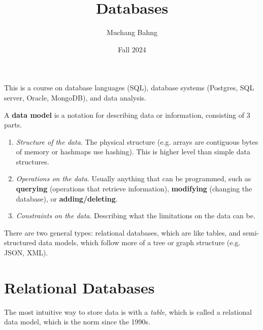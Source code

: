 \documentclass{article}
\begin{document}
\title{Databases}
\author{Muchang Bahng}
\date{Fall 2024}

\maketitle
\tableofcontents
\pagebreak

  This is a course on database languages (SQL), database systems (Postgres, SQL server, Oracle, MongoDB), and data analysis. 

  \begin{definition}
    A \textbf{data model} is a notation for describing data or information, consisting of 3 parts. 
    \begin{enumerate}
      \item \textit{Structure of the data}. The physical structure (e.g. arrays are contiguous bytes of memory or hashmaps use hashing). This is higher level than simple data structures. 
      \item \textit{Operations on the data}. Usually anything that can be programmed, such as \textbf{querying} (operations that retrieve information), \textbf{modifying} (changing the database), or \textbf{adding/deleting}. 
      \item \textit{Constraints on the data}. Describing what the limitations on the data can be. 
    \end{enumerate}
  \end{definition}

  There are two general types: relational databases, which are like tables, and semi-structured data models, which follow more of a tree or graph structure (e.g. JSON, XML).  

\section{Relational Databases}

  The most intuitive way to store data is with a \textit{table}, which is called a relational data model, which is the norm since the 1990s. 
\end{document}

